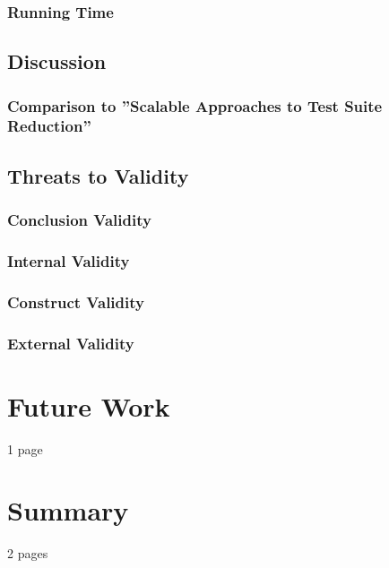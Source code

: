 \documentclass[a4paper,10pt]{article}
\begin{document}
\subsubsection{Running Time}

\subsection{Discussion}

\subsubsection{Comparison to ''Scalable Approaches to Test Suite Reduction''}

\subsection{Threats to Validity}

\subsubsection{Conclusion Validity}

\subsubsection{Internal Validity}

\subsubsection{Construct Validity}

\subsubsection{External Validity}

\section{Future Work}

1 page

\section{Summary}

2 pages

\newpage



\end{document}
